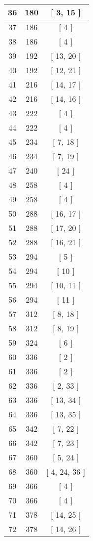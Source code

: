 \begin{center}
\begin{longtable}[H]{|| c c c ||}
36 & 180 & [ 3, 15 ] \\ 
\hline
37 & 186 & [ 4 ] \\ 
\hline
38 & 186 & [ 4 ] \\ 
\hline
39 & 192 & [ 13, 20 ] \\ 
\hline
40 & 192 & [ 12, 21 ] \\ 
\hline
41 & 216 & [ 14, 17 ] \\ 
\hline
42 & 216 & [ 14, 16 ] \\ 
\hline
43 & 222 & [ 4 ] \\ 
\hline
44 & 222 & [ 4 ] \\ 
\hline
45 & 234 & [ 7, 18 ] \\ 
\hline
46 & 234 & [ 7, 19 ] \\ 
\hline
47 & 240 & [ 24 ] \\ 
\hline
48 & 258 & [ 4 ] \\ 
\hline
49 & 258 & [ 4 ] \\ 
\hline
50 & 288 & [ 16, 17 ] \\ 
\hline
51 & 288 & [ 17, 20 ] \\ 
\hline
52 & 288 & [ 16, 21 ] \\ 
\hline
53 & 294 & [ 5 ] \\ 
\hline
54 & 294 & [ 10 ] \\ 
\hline
55 & 294 & [ 10, 11 ] \\ 
\hline
56 & 294 & [ 11 ] \\ 
\hline
57 & 312 & [ 8, 18 ] \\ 
\hline
58 & 312 & [ 8, 19 ] \\ 
\hline
59 & 324 & [ 6 ] \\ 
\hline
60 & 336 & [ 2 ] \\ 
\hline
61 & 336 & [ 2 ] \\ 
\hline
62 & 336 & [ 2, 33 ] \\ 
\hline
63 & 336 & [ 13, 34 ] \\ 
\hline
64 & 336 & [ 13, 35 ] \\ 
\hline
65 & 342 & [ 7, 22 ] \\ 
\hline
66 & 342 & [ 7, 23 ] \\ 
\hline
67 & 360 & [ 5, 24 ] \\ 
\hline
68 & 360 & [ 4, 24, 36 ] \\ 
\hline
69 & 366 & [ 4 ] \\ 
\hline
70 & 366 & [ 4 ] \\ 
\hline
71 & 378 & [ 14, 25 ] \\ 
\hline
72 & 378 & [ 14, 26 ] \\ 

\end{longtable}
\end{center}
